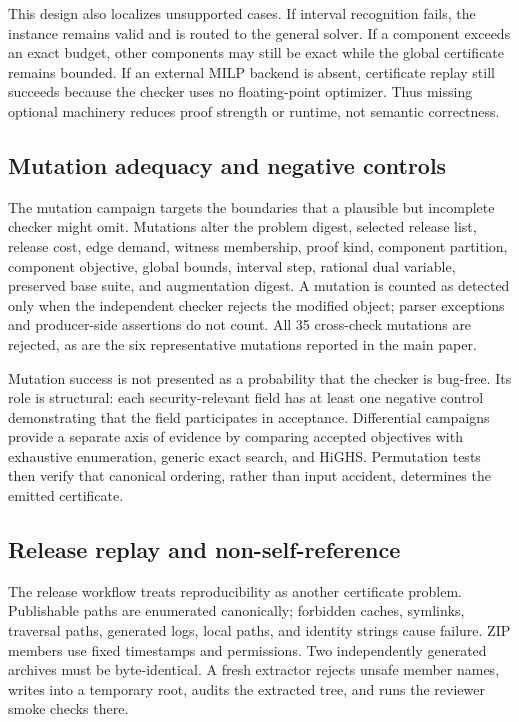\documentclass[10pt,conference]{IEEEtran}
\begin{document}
This design also localizes unsupported cases. If interval recognition fails, the instance remains valid and is routed to the general solver. If a component exceeds an exact budget, other components may still be exact while the global certificate remains bounded. If an external MILP backend is absent, certificate replay still succeeds because the checker uses no floating-point optimizer. Thus missing optional machinery reduces proof strength or runtime, not semantic correctness.

\subsection{Mutation adequacy and negative controls}
The mutation campaign targets the boundaries that a plausible but incomplete checker might omit. Mutations alter the problem digest, selected release list, release cost, edge demand, witness membership, proof kind, component partition, component objective, global bounds, interval step, rational dual variable, preserved base suite, and augmentation digest. A mutation is counted as detected only when the independent checker rejects the modified object; parser exceptions and producer-side assertions do not count. All 35 cross-check mutations are rejected, as are the six representative mutations reported in the main paper.

Mutation success is not presented as a probability that the checker is bug-free. Its role is structural: each security-relevant field has at least one negative control demonstrating that the field participates in acceptance. Differential campaigns provide a separate axis of evidence by comparing accepted objectives with exhaustive enumeration, generic exact search, and HiGHS. Permutation tests then verify that canonical ordering, rather than input accident, determines the emitted certificate.

\subsection{Release replay and non-self-reference}
The release workflow treats reproducibility as another certificate problem. Publishable paths are enumerated canonically; forbidden caches, symlinks, traversal paths, generated logs, local paths, and identity strings cause failure. ZIP members use fixed timestamps and permissions. Two independently generated archives must be byte-identical. A fresh extractor rejects unsafe member names, writes into a temporary root, audits the extracted tree, and runs the reviewer smoke checks there.
\end{document}
